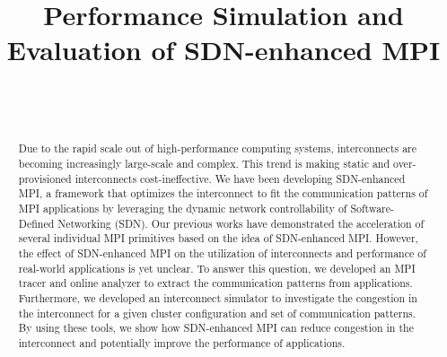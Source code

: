 \documentclass[10pt, a4paper]{IEEEtran}
\begin{document}
\title{Performance Simulation and Evaluation of SDN-enhanced MPI}

\author{%
     \\
     \\
}

\maketitle

\begin{abstract}
    Due to the rapid scale out of high-performance computing systems,
    interconnects are becoming increasingly large-scale and complex. This
    trend is making static and over-provisioned interconnects
    cost-ineffective. We have been developing SDN-enhanced MPI, a framework
    that optimizes the interconnect to fit the communication patterns of MPI
    applications by leveraging the dynamic network controllability of
    Software-Defined Networking (SDN). Our previous works have demonstrated
    the acceleration of several individual MPI primitives based on the idea of
    SDN-enhanced MPI\@. However, the effect of SDN-enhanced MPI on the
    utilization of interconnects and performance of real-world applications is
    yet unclear. To answer this question, we developed an MPI tracer and
    online analyzer to extract the communication patterns from applications.
    Furthermore, we developed an interconnect simulator to investigate the
    congestion in the interconnect for a given cluster configuration and set
    of communication patterns. By using these tools, we show how SDN-enhanced
    MPI can reduce congestion in the interconnect and potentially improve the
    performance of applications.
\end{abstract}
\end{document}
